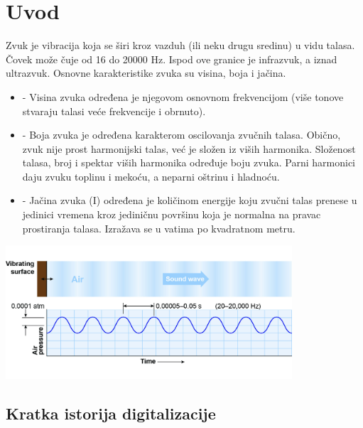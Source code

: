\documentclass[11pt]{article}
\begin{document}
\section{Uvod}
    

    Zvuk je vibracija koja se širi kroz vazduh (ili neku drugu sredinu) u vidu talasa. Čovek može čuje od 16 do 20000 Hz. Ispod ove granice je infrazvuk, a iznad ultrazvuk. Osnovne karakteristike zvuka su visina, boja i jačina.
    \begin {itemize}
        \item[-] Visina zvuka određena je njegovom osnovnom frekvencijom (više tonove stvaraju talasi
        veće frekvencije i obrnuto).
    
        \item[-] Boja zvuka je određena karakterom oscilovanja zvučnih talasa. Obično, zvuk nije prost
        harmonijski talas, već je složen iz viših harmonika. Složenost talasa, broj i spektar viših
        harmonika određuje boju zvuka. Parni harmonici daju zvuku toplinu i mekoću, a neparni
        oštrinu i hladnoću.
    
        \item[-] Jačina zvuka (I) određena je količinom energije koju zvučni talas prenese u jedinici
        vremena kroz jediničnu površinu koja je normalna na pravac prostiranja talasa. Izražava se
        u vatima po kvadratnom metru.
    \end{itemize}
    \centering 
    \includegraphics[width=0.8\textwidth]{airpressure}
    \begin{flushleft}
    \section{Kratka istorija digitalizacije}
\end{flushleft}
\end{document}
